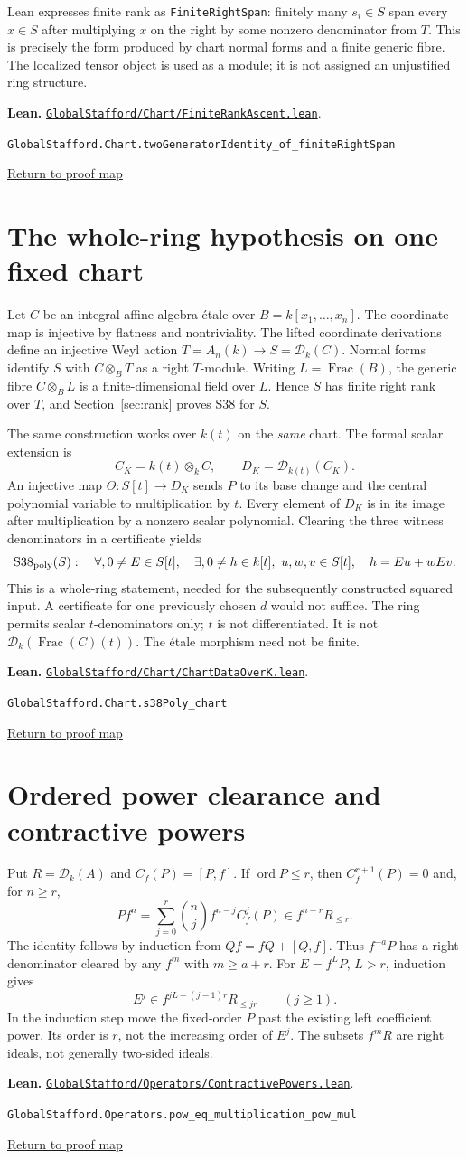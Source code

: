 \documentclass[11pt,a4paper]{article}
\newcommand{\code}[1]{\nolinkurl{#1}}
\newcommand{\D}{\mathcal D}
\newcommand{\ord}{\operatorname{ord}}
\newcommand{\backmap}{\hfill\hyperref[fig:map]{\small Return to proof map}}
\newcommand{\leanref}[2]{\par\smallskip\noindent\textbf{Lean.} \href{https://github.com/itpplasma/global-stafford-formal/blob/b21883a5b3d8f46922713049c3b060523ea3a771/#1}{\nolinkurl{#1}}.\par\noindent\small\code{#2}\par\normalsize\backmap}
\begin{document}
Lean expresses finite rank as \code{FiniteRightSpan}: finitely many $s_i\in S$
span every $x\in S$ after multiplying $x$ on the right by some nonzero
denominator from $T$. This is precisely the form produced by chart normal
forms and a finite generic fibre. The localized tensor object is used as a
module; it is not assigned an unjustified ring structure.
\leanref{GlobalStafford/Chart/FiniteRankAscent.lean}{GlobalStafford.Chart.twoGeneratorIdentity_of_finiteRightSpan}

\section{The whole-ring hypothesis on one fixed chart}\label{sec:chart}
Let $C$ be an integral affine algebra \'etale over $B=k[x_1,\ldots,x_n]$.
The coordinate map is injective by flatness and nontriviality. The lifted
coordinate derivations define an injective Weyl action $T=A_n(k)\to S=\D_k(C)$.
Normal forms identify $S$ with $C\otimes_B T$ as a right $T$-module.
Writing $L=\operatorname{Frac}(B)$, the generic fibre $C\otimes_B L$ is a
finite-dimensional field over $L$. Hence $S$ has finite right rank over $T$,
and Section~\ref{sec:rank} proves S38 for $S$.

The same construction works over $k(t)$ on the \emph{same} chart. The formal
scalar extension is
\[
 C_K=k(t)\otimes_k C,\qquad D_K=\D_{k(t)}(C_K).
\]
An injective map $\Theta:S[t]\to D_K$ sends $P$ to its base change and the
central polynomial variable to multiplication by $t$. Every element of $D_K$
is in its image after multiplication by a nonzero scalar polynomial.
Clearing the three witness denominators in a certificate yields
\[
\mathrm{S38}_{\rm poly}(S):\quad
\forall,0\ne E\in S[t],\quad
\exists,0\ne h\in k[t],\ u,w,v\in S[t],\quad h=Eu+wEv.
\]
This is a whole-ring statement, needed for the subsequently constructed
squared input. A certificate for one previously chosen $d$ would not suffice.
The ring permits scalar $t$-denominators only; $t$ is not differentiated.
It is not $\D_k(\operatorname{Frac}(C)(t))$. The \'etale morphism need not be finite.
\leanref{GlobalStafford/Chart/ChartDataOverK.lean}{GlobalStafford.Chart.s38Poly_chart}

\section{Ordered power clearance and contractive powers}\label{sec:order}
Put $R=\D_k(A)$ and $C_f(P)=[P,f]$. If $\ord P\le r$, then
$C_f^{r+1}(P)=0$ and, for $n\ge r$,
\[
Pf^n=\sum_{j=0}^{r}\binom nj f^{n-j}C_f^j(P)
     \in f^{n-r}R_{\le r}.
\]
The identity follows by induction from $Qf=fQ+[Q,f]$.
Thus $f^{-a}P$ has a right denominator cleared by any $f^m$ with $m\ge a+r$.
For $E=f^LP$, $L>r$, induction gives
\[
 E^j\in f^{jL-(j-1)r}R_{\le jr}\qquad(j\ge1).
\]
In the induction step move the fixed-order $P$ past the existing left
coefficient power. Its order is $r$, not the increasing order of $E^j$.
The subsets $f^mR$ are right ideals, not generally two-sided ideals.
\leanref{GlobalStafford/Operators/ContractivePowers.lean}{GlobalStafford.Operators.pow_eq_multiplication_pow_mul}
\end{document}
